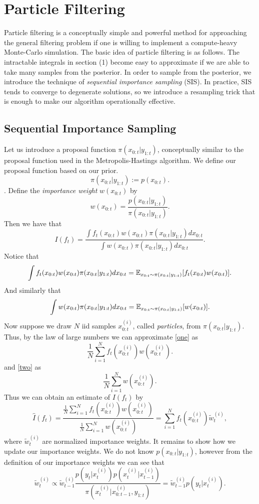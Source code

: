 \documentclass{article}
\numberwithin{equation}{section}
\begin{document}
\section{Particle Filtering}
Particle filtering is a conceptually simple and powerful method for approaching the general filtering problem if one is willing to implement a
compute-heavy Monte-Carlo simulation. The basic idea of particle filtering is as follows. The intractable integrals in
section (1) become easy to approximate if we are able to take many samples from the posterior. In order to sample
from the posterior, we introduce the technique of {\it sequential importance sampling }(SIS). In practice, SIS tends to
converge to degenerate solutions, so we introduce a resampling trick that is enough to make our algorithm operationally
effective.
\subsection{Sequential Importance Sampling}
Let us introduce a proposal function $\pi(x_{0:t}|y_{1:t})$, conceptually similar to the proposal function used in the
Metropolis-Hastings algorithm. We define our proposal function based on our prior.
\[\pi(x_{0:t}|y_{1:t}) := p(x_{0:t}). \]. 
Define the \textit{importance weight}
$w(x_{0:t})$ by 
\[w(x_{0:t}) = \frac{p(x_{0:t}|y_{1:t})}{\pi(x_{0:t}|y_{1:t})}. \]
Then we have that 
\[I(f_t) = \frac{\int f_t(x_{0:t})w(x_{0:t})\pi(x_{0:t}|y_{1:t})d x_{0:t}}{\int w(x_{0:t})\pi(x_{0:t}|y_{1:t})
dx_{0:t}}. \]
Notice that 
\begin{equation}\int f_t(x_{0:t})w(x_{0:t})\pi(x_{0:t}|y_{1:t})d x_{0:t} = \mathbb{E}_{x_{0:t}\sim
\pi(x_{0:t}|y_{1:t})}[f_t(x_{0:t})w(x_{0:t})]. \label{one}\end{equation}
And similarly that 
\begin{equation}\int w(x_{0:t})\pi(x_{0:t}|y_{1:t})d x_{0:t} = \mathbb{E}_{x_{0:t}\sim
    \pi(x_{0:t}|y_{1:t})}[w(x_{0:t})].\label{two}
\end{equation}
Now suppose we draw $N$ iid samples $x_{0:t}^{(i)}$, called \textit{particles}, from $\pi(x_{0:t}|y_{1:t})$. Thus, by the
law of large numbers we can
approximate \ref{one} as 
\[\frac{1}{N}\sum_{i=1}^N f_t\left(x_{0:t}^{(i)}\right) w\left(x_{0:t}^{(i)}\right). \] 
and \ref{two} as 
\[\frac{1}{N}\sum_{i=1}^N  w\left(x_{0:t}^{(i)}\right). \] 
Thus we can obtain an estimate of $I(f_t)$ by 
\[\hat{I}(f_t) = \frac{\frac{1}{N}\sum_{i=1}^N f_t(x_{0:t}^{(i)}) w(x_{0:t}^{(i)})}{\frac{1}{N}\sum_{i=1}^N 
w(x_{0:t}^{(i)})} = \sum_{i=1}^Nf_t\left(x_{0:t}^{(i)}\right)\tilde{w}_t^{(i)},\]
where $\tilde{w}_t^{(i)}$ are normalized importance weights. It remains to show how we update our importance weights. We
do not know $p(x_{0:t}|y_{1:t})$, however from the definition of our importance weights  we can see that 
\begin{equation}\tilde{w}_t^{(i)} \propto
    \tilde{w}_{t-1}^{(i)}\frac{p(y_t|x_t^{(i)})p(x_t^{(i)}|x_{t-1}^{(i)})}{\pi(x_t^{(i)}|x_{0:t-1}^{(i)}, y_{1:t})} =
\tilde{w}_{t-1}^{(i)} p\left(y_t|x_{t}^{(i)}\right).\label{recursive}\end{equation}
\end{document}
